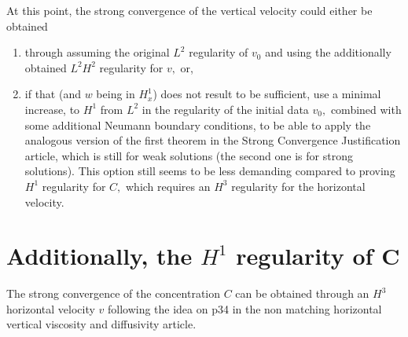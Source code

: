\documentclass[11pt]{article}
\begin{document}
At this point, the strong convergence of the vertical velocity could either be obtained
\begin{enumerate}
\item through assuming the original $L^2$ regularity of $v_0$ and using the additionally obtained $L^2 H^2$ regularity for $v,$ or,
\item if that (and $w$ being in $H^1_x$)  does not result to be sufficient, use a minimal increase, to $H^1$ from $L^2$ in the regularity of the initial data $v_0,$ combined with some additional Neumann boundary conditions, to be able to apply the analogous version of the first theorem in the Strong Convergence Justification article, which is still for weak solutions (the second one is for strong solutions). This option still seems to be less demanding compared to proving $H^1$ regularity for $C,$ which requires an $H^3$ regularity for the horizontal velocity.
\end{enumerate}

\appendix

\section{Additionally, the $H^1$ regularity of C}

The strong convergence of the concentration $C$ can be obtained through an $H^3$ horizontal velocity $v$ following the idea on p34 in the non matching horizontal vertical viscosity and diffusivity article. 
\end{document}
